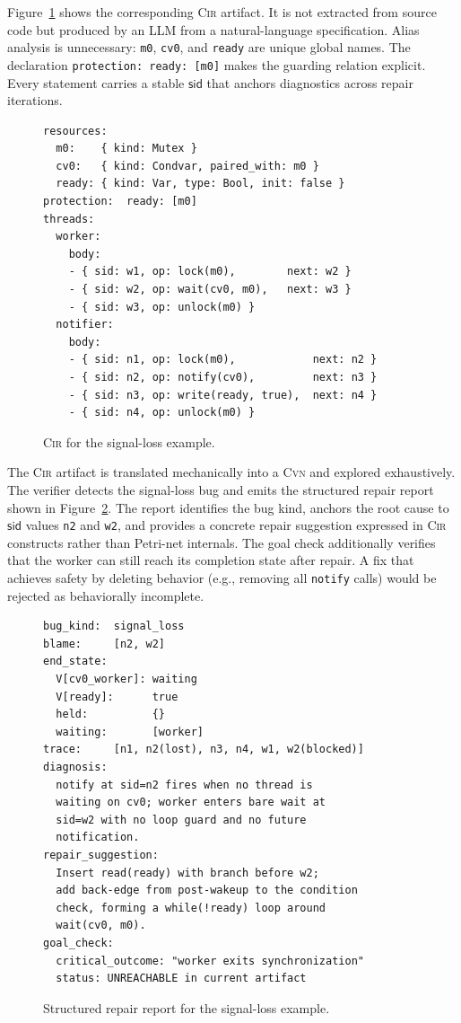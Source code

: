 \documentclass{article}
\begin{document}
Figure~\ref{fig:cir-a} shows the corresponding \textsc{Cir} artifact. It is not extracted from source code but produced by an LLM from a natural-language specification. Alias analysis is unnecessary: \texttt{m0}, \texttt{cv0}, and \texttt{ready} are unique global names. The declaration \texttt{protection:\ ready:\ [m0]} makes the guarding relation explicit. Every statement carries a stable $\mathsf{sid}$ that anchors diagnostics across repair iterations.

\begin{figure}[t]
\begin{lstlisting}[basicstyle=\small\ttfamily, frame=single]
resources:
  m0:    { kind: Mutex }
  cv0:   { kind: Condvar, paired_with: m0 }
  ready: { kind: Var, type: Bool, init: false }
protection:  ready: [m0]
threads:
  worker:
    body:
    - { sid: w1, op: lock(m0),        next: w2 }
    - { sid: w2, op: wait(cv0, m0),   next: w3 }
    - { sid: w3, op: unlock(m0) }
  notifier:
    body:
    - { sid: n1, op: lock(m0),            next: n2 }
    - { sid: n2, op: notify(cv0),         next: n3 }
    - { sid: n3, op: write(ready, true),  next: n4 }
    - { sid: n4, op: unlock(m0) }
\end{lstlisting}
\caption{\textsc{Cir} for the signal-loss example.}
\label{fig:cir-a}
\end{figure}

The \textsc{Cir} artifact is translated mechanically into a \textsc{Cvn} and explored exhaustively. The verifier detects the signal-loss bug and emits the structured repair report shown in Figure~\ref{fig:repair-report}. The report identifies the bug kind, anchors the root cause to $\mathsf{sid}$ values \texttt{n2} and \texttt{w2}, and provides a concrete repair suggestion expressed in \textsc{Cir} constructs rather than Petri-net internals. The goal check additionally verifies that the worker can still reach its completion state after repair.  A fix that achieves safety by deleting behavior (e.g., removing all \texttt{notify} calls) would be rejected as behaviorally incomplete.

\begin{figure}[t]
\begin{lstlisting}[basicstyle=\small\ttfamily, frame=single]
bug_kind:  signal_loss
blame:     [n2, w2]
end_state:
  V[cv0_worker]: waiting
  V[ready]:      true
  held:          {}
  waiting:       [worker]
trace:     [n1, n2(lost), n3, n4, w1, w2(blocked)]
diagnosis:
  notify at sid=n2 fires when no thread is
  waiting on cv0; worker enters bare wait at
  sid=w2 with no loop guard and no future
  notification.
repair_suggestion:
  Insert read(ready) with branch before w2;
  add back-edge from post-wakeup to the condition
  check, forming a while(!ready) loop around
  wait(cv0, m0).
goal_check:
  critical_outcome: "worker exits synchronization"
  status: UNREACHABLE in current artifact
\end{lstlisting}
\caption{Structured repair report for the signal-loss example.}
\label{fig:repair-report}
\end{figure}
\end{document}
